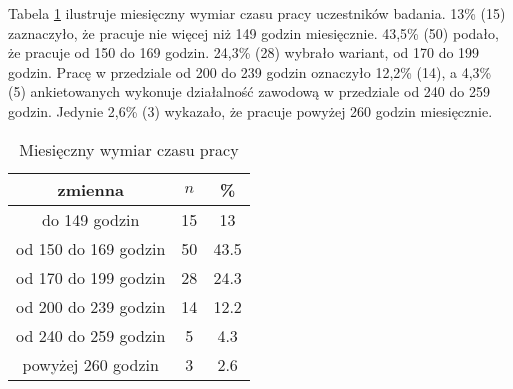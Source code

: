 Tabela \ref{tab:Q3} ilustruje miesięczny wymiar czasu pracy uczestników badania. 13\% (15) zaznaczyło, że pracuje nie więcej niż 149 godzin miesięcznie. 43,5\%  (50) podało, że pracuje od 150 do 169 godzin. 24,3\% (28) wybrało wariant, od 170 do 199 godzin. Pracę w przedziale od 200 do 239 godzin oznaczyło 12,2\% (14), a 4,3\% (5) ankietowanych wykonuje działalność zawodową w przedziale od 240 do 259 godzin. Jedynie 2,6\% (3) wykazało, że pracuje powyżej 260 godzin miesięcznie.


 
\begin{table}[H]
\caption{Miesięczny wymiar czasu pracy}
\centering
\begin{tabular}{ | c | c | c |}
\hline
zmienna & $n$ & \% \\
\hline
do 149 godzin  &  15  & 13 \\
\hline
od 150 do 169 godzin  &  50  & 43.5 \\
\hline
od 170 do 199 godzin  &  28  & 24.3 \\
\hline
od 200 do 239 godzin  &  14  & 12.2 \\
\hline
od 240 do 259 godzin  &  5  & 4.3 \\
\hline
powyżej 260 godzin  &  3  & 2.6 \\
\hline
\end{tabular}
\label{tab:Q3}
\end{table}

